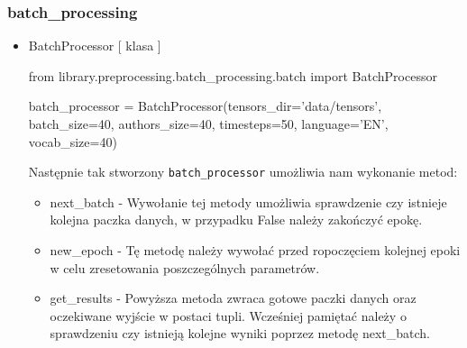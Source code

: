 \subsubsection{batch\_processing}

\myspace
{}
\myspace

\begin{itemize}

\item {BatchProcessor [ klasa ] }
\begin{import}
from library.preprocessing.batch_processing.batch import BatchProcessor

batch_processor = BatchProcessor(tensors_dir='data/tensors',
                                             batch_size=40,
                                             authors_size=40,
                                             timesteps=50,
                                             language='EN',
                                             vocab_size=40)
\end{import}

Następnie tak stworzony \texttt{batch_processor} umożliwia nam wykonanie metod:

\begin{itemize}
	\item {next\_batch } - 
	Wywołanie tej metody umożliwia sprawdzenie czy istnieje kolejna paczka danych, w przypadku False
	należy zakończyć epokę.
	
	\item {new\_epoch } - 
	Tę metodę należy wywołać przed ropoczęciem kolejnej epoki w celu zresetowania poszczególnych 
	parametrów.
	
	\item { get\_results } - 
	Powyższa metoda zwraca gotowe paczki danych oraz oczekiwane wyjście w postaci tupli. 
	Wcześniej pamiętać należy o sprawdzeniu czy istnieją kolejne wyniki poprzez metodę next\_batch.
\end{itemize}

\end{itemize}